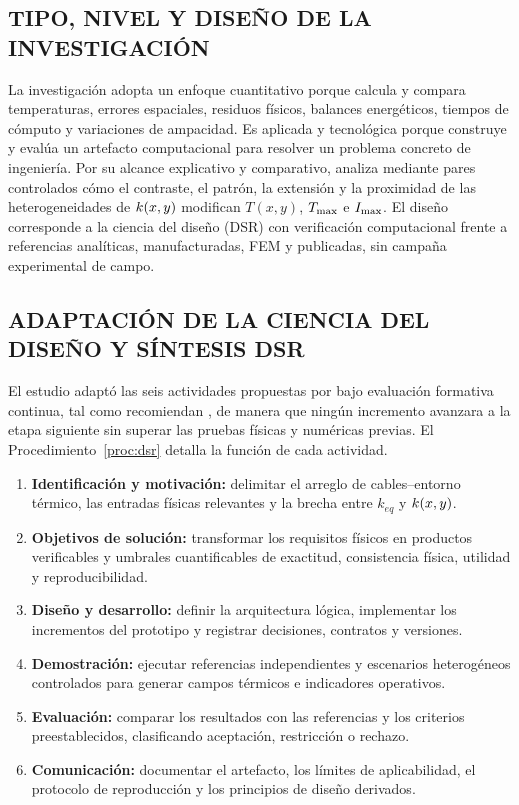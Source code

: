 \subsection{TIPO, NIVEL Y DISEÑO DE LA INVESTIGACIÓN}

La investigación adopta un enfoque cuantitativo porque calcula y compara temperaturas, errores espaciales, residuos físicos, balances energéticos, tiempos de cómputo y variaciones de ampacidad. Es aplicada y tecnológica porque construye y evalúa un artefacto computacional para resolver un problema concreto de ingeniería. Por su alcance explicativo y comparativo, analiza mediante pares controlados cómo el contraste, el patrón, la extensión y la proximidad de las heterogeneidades de $k(x,y)$ modifican $T(x,y)$, $T_{\max}$ e $I_{\max}$. El diseño corresponde a la ciencia del diseño (DSR) con verificación computacional frente a referencias analíticas, manufacturadas, FEM y publicadas, sin campaña experimental de campo.

\subsection{ADAPTACIÓN DE LA CIENCIA DEL DISEÑO Y SÍNTESIS DSR}

El estudio adaptó las seis actividades propuestas por \textcite[55--56]{peffers2007} bajo evaluación formativa continua, tal como recomiendan \textcite[198--203]{delport2024}, de manera que ningún incremento avanzara a la etapa siguiente sin superar las pruebas físicas y numéricas previas. El Procedimiento~\ref{proc:dsr} detalla la función de cada actividad.

\begin{procedure}[htbp]
\caption{Proceso DSR adaptado a la investigación. Fuente: Elaboración propia a partir de \textcite{peffers2007} y \textcite{gregor2013}.}
\label{proc:dsr}
\begin{enumerate}[label=\textbf{A\arabic*.}]
  \item \textbf{Identificación y motivación:} delimitar el arreglo de cables--entorno térmico, las entradas físicas relevantes y la brecha entre $k_{eq}$ y $k(x,y)$.
  \item \textbf{Objetivos de solución:} transformar los requisitos físicos en productos verificables y umbrales cuantificables de exactitud, consistencia física, utilidad y reproducibilidad.
  \item \textbf{Diseño y desarrollo:} definir la arquitectura lógica, implementar los incrementos del prototipo y registrar decisiones, contratos y versiones.
  \item \textbf{Demostración:} ejecutar referencias independientes y escenarios heterogéneos controlados para generar campos térmicos e indicadores operativos.
  \item \textbf{Evaluación:} comparar los resultados con las referencias y los criterios preestablecidos, clasificando aceptación, restricción o rechazo.
  \item \textbf{Comunicación:} documentar el artefacto, los límites de aplicabilidad, el protocolo de reproducción y los principios de diseño derivados.
\end{enumerate}
\end{procedure}

